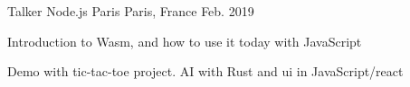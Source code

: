 

\begin{cventries}

  \cventry
    {Talker} %
    {Node.js Paris} %
    {Paris, France} %
    {Feb. 2019} %
    {
      \begin{cvitems} %
        \item {Introduction to Wasm, and how to use it today with JavaScript}
        \item {Demo with tic-tac-toe project. AI with Rust and ui in JavaScript/react}
      \end{cvitems}
    }

\end{cventries}
